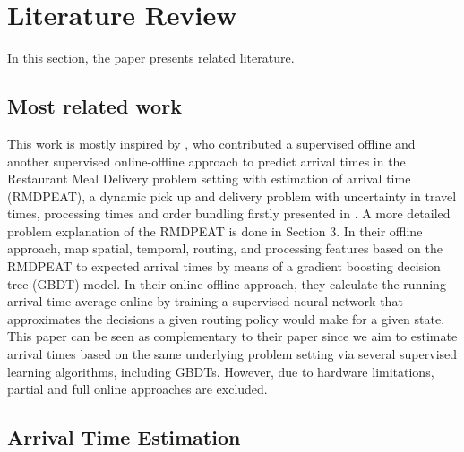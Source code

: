 \chapter{Literature Review}

In this section, the paper presents related literature. 


\section{Most related work}

This work is mostly inspired by \cite{Hildebrandt2020_EAT}, who contributed a supervised offline and another supervised online-offline approach to predict arrival times in the Restaurant Meal Delivery problem setting with estimation of arrival time (RMDPEAT), a dynamic pick up and delivery problem with uncertainty in travel times, processing times and order bundling firstly  presented in \cite{UlmerRMDP}. A more detailed problem explanation of the RMDPEAT is done in Section 3. 
In their offline approach, \cite{Hildebrandt2020_EAT} map spatial, temporal, routing, and processing features based on the RMDPEAT to expected arrival times by means of a gradient boosting decision tree (GBDT) model. In their online-offline approach, they calculate the running arrival time average online by training a supervised neural network that approximates the decisions a given routing policy would make for a given state.
This paper can be seen as complementary to their paper since we aim to estimate arrival times based on the same underlying problem setting via several supervised learning algorithms, including GBDTs. However, due to hardware limitations, partial and full online approaches are excluded. 


\section{Arrival Time Estimation}




